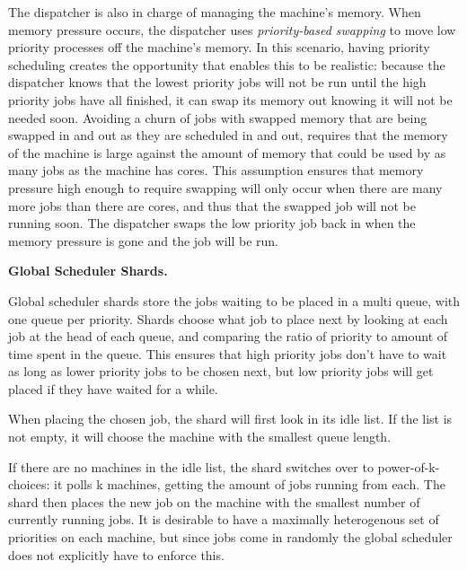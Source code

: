 The dispatcher is also in charge of managing the machine's memory. When memory
pressure occurs, the dispatcher uses \textit{priority-based swapping} to move low
priority processes off the machine's memory. In this scenario, having priority
scheduling creates the opportunity that enables this to be realistic: because
the dispatcher knows that the lowest priority jobs will not be run until the
high priority jobs have all finished, it can swap its memory out knowing it will
not be needed soon. Avoiding a churn of jobs with swapped memory that are being
swapped in and out as they are scheduled in and out, requires that the memory of
the machine is large against the amount of memory that could be used by as many
jobs as the machine has cores. This assumption ensures that memory pressure high
enough to require swapping will only occur when there are many more jobs than
there are cores, and thus that the swapped job will not be running soon. The
dispatcher swaps the low priority job back in when the memory pressure is gone
and the job will be run.



\textbf{Global Scheduler Shards.}

Global scheduler shards store the jobs waiting to be placed in a multi queue,
with one queue per priority. Shards choose what job to place next by looking at
each job at the head of each queue, and comparing the ratio of priority to
amount of time spent in the queue. This ensures that high priority jobs don't
have to wait as long as lower priority jobs to be chosen next, but low priority
jobs will get placed if they have waited for a while.

When placing the chosen job, the shard will first look in its idle list. If the
list is not empty, it will choose the machine with the smallest queue length.

If there are no machines in the idle list, the shard switches over to
power-of-k-choices: it polls k machines, getting the amount of jobs running from
each. The shard then places the new job on the machine with the smallest number
of currently running jobs. It is desirable to have a maximally heterogenous set
of priorities on each machine, but since jobs come in randomly the global
scheduler does not explicitly have to enforce this.
